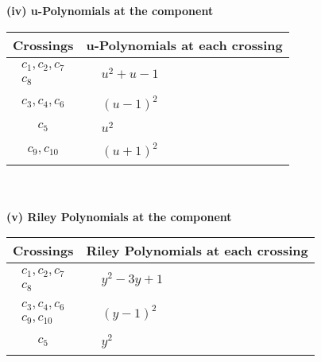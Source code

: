 \documentclass[1p]{elsarticle_modified}
\theoremstyle{definition}
\begin{document}
\newpage\renewcommand{\arraystretch}{1}
\flushleft \textbf{(iv) u-Polynomials at the component}\newline \\
\begin{tabular}{m{50pt}|m{274pt}}
Crossings & \hspace{64pt}u-Polynomials at each crossing \\
\hline $$\begin{aligned}c_{1},c_{2},c_{7}\\c_{8}\end{aligned}$$&$\begin{aligned}
&u^2+u-1
\end{aligned}$\\
\hline $$\begin{aligned}c_{3},c_{4},c_{6}\end{aligned}$$&$\begin{aligned}
&(u-1)^2
\end{aligned}$\\
\hline $$\begin{aligned}c_{5}\end{aligned}$$&$\begin{aligned}
&u^2
\end{aligned}$\\
\hline $$\begin{aligned}c_{9},c_{10}\end{aligned}$$&$\begin{aligned}
&(u+1)^2
\end{aligned}$\\
\hline
\end{tabular}\\~\\
\newpage\renewcommand{\arraystretch}{1}
\flushleft \textbf{(v) Riley Polynomials at the component}\newline \\
\begin{tabular}{m{50pt}|m{274pt}}
Crossings & \hspace{64pt}Riley Polynomials at each crossing \\
\hline $$\begin{aligned}c_{1},c_{2},c_{7}\\c_{8}\end{aligned}$$&$\begin{aligned}
&y^2-3 y+1
\end{aligned}$\\
\hline $$\begin{aligned}c_{3},c_{4},c_{6}\\c_{9},c_{10}\end{aligned}$$&$\begin{aligned}
&(y-1)^2
\end{aligned}$\\
\hline $$\begin{aligned}c_{5}\end{aligned}$$&$\begin{aligned}
&y^2
\end{aligned}$\\
\hline
\end{tabular}\\~\\
\end{document}
